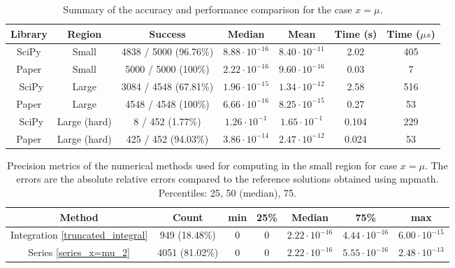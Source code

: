 \documentclass[10pt,a4paper,oneside]{article}
\numberwithin{equation}{section}
\begin{document}
\begin{table}[htbp]
\centering
\scalebox{0.9}
{
\begin{tabular}{ccccc|cc}
\hline
Library & Region & Success & Median & Mean & Time (s) & Time ($\mu s$)\\
\hline
SciPy & Small & 4838 / 5000 (96.76\%) &  $8.88\cdot 10^{-16}$ & $8.40 \cdot 10^{-11}$ & 2.02 & 405\\
Paper & Small & 5000 / 5000 (100\%) & $2.22\cdot 10^{-16}$ & $9.60\cdot 10^{-16}$ & 0.03 & 7\\
	\hline\
SciPy & Large & 3084 / 4548 (67.81\%) & $1.96\cdot 10^{-15}$ & $1.34\cdot 10^{-12}$ & 2.58 & 516\\
Paper & Large & 4548 / 4548 (100\%) & $6.66\cdot 10^{-16}$ & $8.25\cdot 10^{-15}$ & 0.27 & 53\\
	\hline\
SciPy & Large (hard) & 8 / 452 (1.77\%) & $1.26\cdot 10^{-1}$ & $1.65\cdot 10^{-1}$ & 0.104 & 229\\
Paper & Large (hard) & 425 / 452 (94.03\%) & $3.86\cdot 10^{-14}$ & $2.47\cdot 10^{-12}$ & 0.024 & 53\\
	\hline
\end{tabular}
}
	\caption{Summary of the accuracy and performance comparison for the case $x=\mu$.}
	\label{table_comparison_case_x_eq_mu_summary}
\end{table}

\begin{table}[htbp]
\centering
\scalebox{0.9}
{
\begin{tabular}{ccccccc}
\hline
Method & Count & min & 25\% & Median & 75\% & max\\
\hline
Integration \eqref{truncated_integral} & 949 (18.48\%) & 0 & 0 & $2.22\cdot 10^{-16}$ & $4.44\cdot 10^{-16}$ & $6.00\cdot 10^{-15}$\\
Series \eqref{series_x=mu_2} & 4051 (81.02\%) & 0 & 0 & $2.22\cdot 10^{-16}$ & $5.55\cdot 10^{-16}$ & $2.48\cdot 10^{-13}$\\
	\hline
\end{tabular}}
	\caption{Precision metrics of the numerical methods used for computing in the small region for case $x=\mu$. The errors are the absolute relative errors compared to the reference solutions obtained using mpmath. Percentiles: 25, 50 (median), 75.}
	\label{table_methods_case_x_eq_mu_small}
\end{table}
\end{document}
